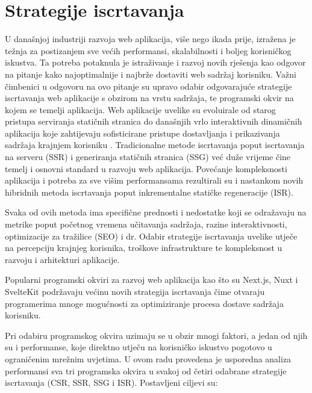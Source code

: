 \section{Strategije iscrtavanja}

U današnjoj industriji razvoja web aplikacija, više nego ikada prije, izražena je težnja za postizanjem sve većih performansi, skalabilnosti i boljeg korisničkog iskustva. Ta potreba potaknula je istraživanje i razvoj novih rješenja kao odgovor na pitanje kako najoptimalnije i najbrže dostaviti web sadržaj korisniku. Važni čimbenici u odgovoru na ovo pitanje su upravo odabir odgovarajuće strategije iscrtavanja web aplikacije s obzirom na vrstu sadržaja, te programski okvir na kojem se temelji aplikacija. Web aplikacije uvelike su evoluirale od starog pristupa serviranja statičnih stranica do današnjih vrlo interaktivnih dinamičnih aplikacija koje zahtijevaju sofisticirane pristupe dostavljanja i prikazivanja sadržaja krajnjem korisniku \cite{moore2024rendering}. Tradicionalne metode iscrtavanja poput iscrtavanja na serveru (SSR) i generiranja statičnih stranica (SSG) već duže vrijeme čine temelj i osnovni standard u razvoju web aplikacija. Povećanje kompleksnosti aplikacija i potreba za sve višim performansama rezultirali su i nastankom novih hibridnih metoda iscrtavanja poput inkrementalne statičke regeneracije (ISR).

\bigskip

Svaka od ovih metoda ima specifične prednosti i nedostatke koji se odražavaju na metrike poput početnog vremena učitavanja sadržaja, razine interaktivnosti, optimizacije za tražilice (SEO) i dr. Odabir strategije iscrtavanja uvelike utječe na percepciju krajnjeg korisnika, troškove infrastrukture te kompleksnost u razvoju i arhitekturi aplikacije.

\bigskip

Popularni programski okviri za razvoj web aplikacija kao što su Next.js, Nuxt i SvelteKit podržavaju većinu novih strategija iscrtavanja čime otvaraju programerima mnoge mogućnosti za optimiziranje procesa dostave sadržaja korisniku.

\bigskip

Pri odabiru programskog okvira uzimaju se u obzir mnogi faktori, a jedan od njih su i performanse, koje direktno utječu na korisničko iskustvo pogotovo u ograničenim mrežnim uvjetima.
U ovom radu provedena je usporedna analiza performansi sva tri programska okvira u svakoj od  četiri odabrane strategije iscrtavanja (CSR, SSR, SSG i ISR). Postavljeni ciljevi su:

